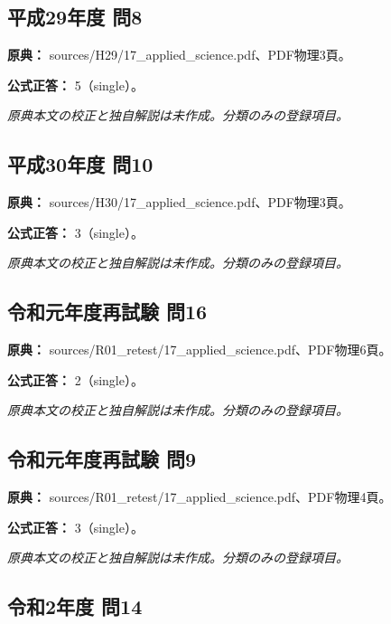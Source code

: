 \subsection{平成29年度 問8}
\label{q:h29-reg-applied-08}

\noindent\textbf{原典：} sources/H29/17\_applied\_science.pdf、PDF物理3頁。

\textbf{公式正答：} 5（single）。

\par\textit{原典本文の校正と独自解説は未作成。分類のみの登録項目。}

\subsection{平成30年度 問10}
\label{q:h30-reg-applied-10}

\noindent\textbf{原典：} sources/H30/17\_applied\_science.pdf、PDF物理3頁。

\textbf{公式正答：} 3（single）。

\par\textit{原典本文の校正と独自解説は未作成。分類のみの登録項目。}

\subsection{令和元年度再試験 問16}
\label{q:r01-ret-applied-16}

\noindent\textbf{原典：} sources/R01\_retest/17\_applied\_science.pdf、PDF物理6頁。

\textbf{公式正答：} 2（single）。

\par\textit{原典本文の校正と独自解説は未作成。分類のみの登録項目。}

\subsection{令和元年度再試験 問9}
\label{q:r01-ret-applied-09}

\noindent\textbf{原典：} sources/R01\_retest/17\_applied\_science.pdf、PDF物理4頁。

\textbf{公式正答：} 3（single）。

\par\textit{原典本文の校正と独自解説は未作成。分類のみの登録項目。}

\subsection{令和2年度 問14}
\label{q:r02-reg-applied-14}

